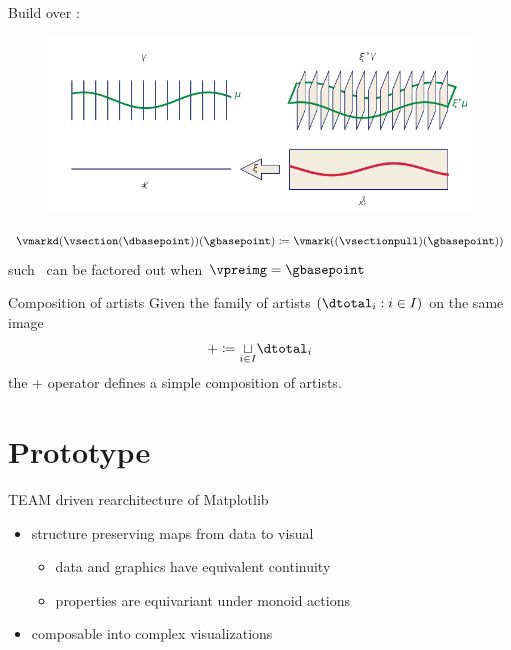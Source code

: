 \documentclass[xcolor={dvipsnames}, handout]{beamer}
\begin{document}
\begin{frame}{Build \vmark over \dbase:\vmarkd}
\begin{figure}[H]
    \includegraphics[width=1\textwidth]{figures/math/q_hat.png}
\end{figure}
\begin{equation*}\label{eq:qhat_q_s}
    \vmarkd(\vsection(\dbasepoint))(\gbasepoint) \coloneqq \vmark((\vsectionpull)(\gbasepoint))
\end{equation*} 
such \gbasepoint\ can be factored out when $\vpreimg = \gbasepoint$
\end{frame}

\begin{frame}{Composition of artists} 
    Given the family of artists $(\dtotal_i: i\in I)$ on the same image
    \begin{equation*}
        + \coloneqq \underset{i\in I}{\sqcup} \dtotal_{i}
    \end{equation*}
    the + operator defines a simple composition of artists. 
\end{frame}


\section{Prototype}
\begin{frame}{TEAM driven rearchitecture of Matplotlib}
    \begin{itemize}
        \begin{itemize}
            \item topologically complex heterogenous data 
            \item target display spaces
        \end{itemize}
        \pause
        \item structure preserving maps from data to visual
            \begin{itemize}
                \item data and graphics have equivalent continuity
                \item properties are equivariant under monoid actions
            \end{itemize}  
        \pause
        \item composable into complex visualizations
    \end{itemize}
\end{frame}
\end{document}
